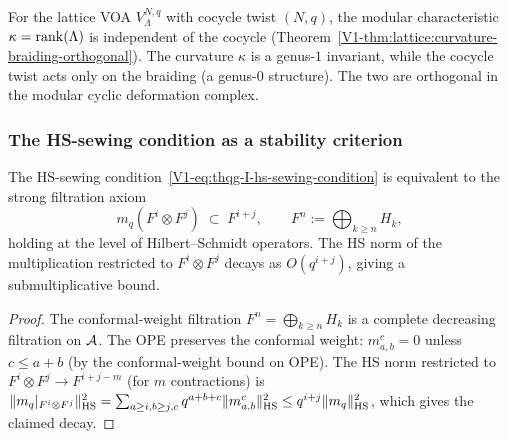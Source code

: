 \begin{remark}
For the lattice VOA $V_\Lambda^{N,q}$ with cocycle twist $(N,q)$, the modular characteristic $\kappa = \operatorname{rank}(\Lambda)$ is independent of the cocycle (Theorem~\ref{V1-thm:lattice:curvature-braiding-orthogonal}). The curvature $\kappa$ is a genus-$1$ invariant, while the cocycle twist acts only on the braiding (a genus-$0$ structure). The two are orthogonal in the modular cyclic deformation complex.
\end{remark}

\subsubsection{The HS-sewing condition as a stability criterion}

\begin{proposition}
The HS-sewing condition~\eqref{V1-eq:thqg-I-hs-sewing-condition} is equivalent to the strong filtration axiom
\begin{equation}%
m_q(F^i \otimes F^j) \;\subset\; F^{i+j}, \qquad F^n := \bigoplus_{k \geq n} H_k,
\end{equation}
holding at the level of Hilbert--Schmidt operators. The HS norm of the multiplication restricted to $F^i \otimes F^j$ decays as $O(q^{i+j})$, giving a submultiplicative bound.
\end{proposition}

\begin{proof}
The conformal-weight filtration $F^n = \bigoplus_{k \geq n} H_k$ is a complete decreasing filtration on $\mathcal{A}$. The OPE preserves the conformal weight: $m^c_{a,b} = 0$ unless $c \leq a + b$ (by the conformal-weight bound on OPE). The HS norm restricted to $F^i \otimes F^j \to F^{i+j-m}$ (for $m$ contractions) is $\|m_q|_{F^i \otimes F^j}\|_{\operatorname{HS}}^2 = \sum_{a \geq i, b \geq j, c} q^{a+b+c} \|m^c_{a,b}\|_{\operatorname{HS}}^2 \leq q^{i+j} \|m_q\|_{\operatorname{HS}}^2$, which gives the claimed decay.
\end{proof}

